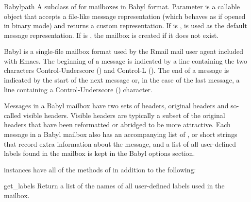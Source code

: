\begin{seealso}
\end{seealso}

\subsubsection{}
\label{mailbox-babyl}

\begin{classdesc}{Babyl}{path}
A subclass of  for mailboxes in Babyl format. Parameter
 is a callable object that accepts a file-like message
representation (which behaves as if opened in binary mode) and returns a custom
representation. If  is ,  is used
as the default message representation. If  is , the
mailbox is created if it does not exist.
\end{classdesc}

Babyl is a single-file mailbox format used by the Rmail mail user agent
included with Emacs. The beginning of a message is indicated by a line
containing the two characters Control-Underscore
() and Control-L ().
The end of a message is indicated by the start of the next message or, in the
case of the last message, a line containing a Control-Underscore
() character.

Messages in a Babyl mailbox have two sets of headers, original headers and
so-called visible headers. Visible headers are typically a subset of the
original headers that have been reformatted or abridged to be more attractive.
Each message in a Babyl mailbox also has an accompanying list of ,
or short strings that record extra information about the message, and a list of
all user-defined labels found in the mailbox is kept in the Babyl options
section.

 instances have all of the methods of  in addition
to the following:

\begin{methoddesc}{get_labels}{}
Return a list of the names of all user-defined labels used in the mailbox.
\end{methoddesc}

